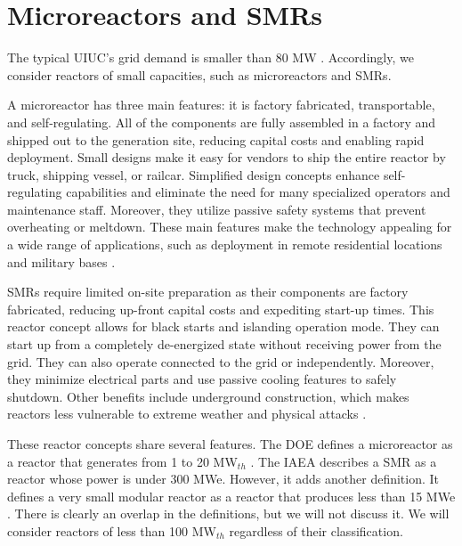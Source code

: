\documentclass[11pt,letterpaper]{article}
\begin{document}
\section{Microreactors and \glspl{SMR}}
\label{sec:reactors}

The typical \gls{UIUC}'s grid demand is smaller than 80 MW \cite{dotson_optimal_2020}.
Accordingly, we consider reactors of small capacities, such as microreactors and \glspl{SMR}.

A microreactor has three main features: it is factory fabricated, transportable, and self-regulating.
All of the components are fully assembled in a factory and shipped out to the generation site, reducing capital costs and enabling rapid deployment.
Small designs make it easy for vendors to ship the entire reactor by truck, shipping vessel, or railcar.
Simplified design concepts enhance self-regulating capabilities and eliminate the need for many specialized operators and maintenance staff.
Moreover, they utilize passive safety systems that prevent overheating or meltdown.
These main features make the technology appealing for a wide range of applications, such as deployment in remote residential locations and military bases \cite{us-doe_ultimate_2019}.

\glspl{SMR} require limited on-site preparation as their components are factory fabricated, reducing up-front capital costs and expediting start-up times.
This reactor concept allows for black starts and islanding operation mode.
They can start up from a completely de-energized state without receiving power from the grid.
They can also operate connected to the grid or independently.
Moreover, they minimize electrical parts and use passive cooling features to safely shutdown.
Other benefits include underground construction, which makes reactors less vulnerable to extreme weather and physical attacks \cite{us-doe_ultimate_2019}.

These reactor concepts share several features.
The \gls{DOE} defines a microreactor as a reactor that generates from 1 to 20 MW$_{th}$ \cite{us-doe_ultimate_2019}.
The \gls{IAEA} describes a \gls{SMR} as a reactor whose power is under 300 MWe.
However, it adds another definition.
It defines a very small modular reactor as a reactor that produces less than 15 MWe \cite{world_nuclear_association_small_2020}.
There is clearly an overlap in the definitions, but we will not discuss it.
We will consider reactors of less than 100 MW$_{th}$ regardless of their classification.
\end{document}
